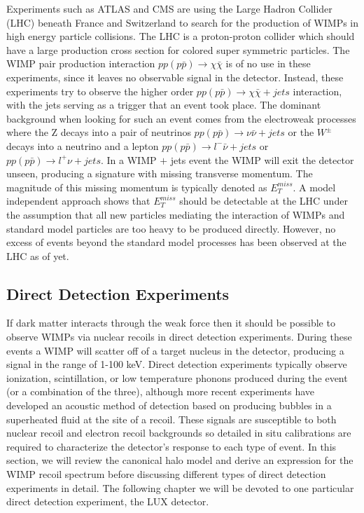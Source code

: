\documentclass[a4paper,12pt]{article}
\begin{document}
Experiments such as ATLAS and CMS are using the Large Hadron Collider (LHC) beneath France and Switzerland to search for the production of WIMPs in high energy particle collisions.  The LHC is a proton-proton collider which should have a large production cross section for colored super symmetric particles.  The WIMP pair production interaction $pp (p\bar{p}) \rightarrow \chi \bar{\chi}$ is of no use in these experiments, since it leaves no observable signal in the detector.  Instead, these experiments try to observe the higher order $pp (p\bar{p}) \rightarrow \chi \bar{\chi} + jets$ interaction, with the jets serving as a trigger that an event took place.  The dominant background when looking for such an event comes from the electroweak processes where the Z decays into a pair of neutrinos $pp (p\bar{p}) \rightarrow \nu \bar{\nu} + jets$ or the $W^{\pm}$ decays into a neutrino and a lepton $pp (p\bar{p}) \rightarrow l^{-}\bar{\nu} + jets$ or $pp (p\bar{p}) \rightarrow l^{+}\nu + jets$. In a WIMP $+$ jets event the WIMP will exit the detector unseen, producing a signature with missing transverse momentum.  The magnitude of this missing momentum is typically denoted as $E_T^{miss}$.  A model independent approach shows that $E_T^{miss}$ should be detectable at the LHC under the assumption that all new particles mediating the interaction of WIMPs and standard model particles are too heavy to be produced directly.  \cite{Beltran} However, no excess of events beyond the standard model processes has been observed at the LHC as of yet.  \cite{ATLAS}


\subsection{Direct Detection Experiments}
If dark matter interacts through the weak force then it should be possible to observe WIMPs via nuclear recoils in direct detection experiments. During these events a WIMP will scatter off of a target nucleus in the detector, producing a signal in the range of 1-100 keV. \cite{Lewin}   Direct detection experiments typically observe ionization, scintillation, or low temperature phonons produced during the event (or a combination of the three), although more recent experiments have developed an acoustic method of detection based on producing bubbles in a superheated fluid at the site of a recoil.  These signals are susceptible to both nuclear recoil and electron recoil backgrounds so detailed in situ calibrations are required to characterize the detector's response to each type of event.  In this section, we will review the canonical halo model and derive an expression for the WIMP recoil spectrum before discussing different types of direct detection experiments in detail.  The following chapter we will be devoted to one particular direct detection experiment, the LUX detector.
\end{document}
